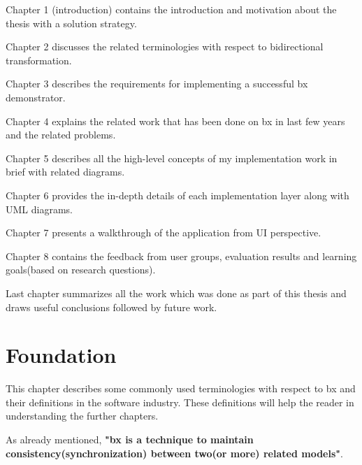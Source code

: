 Chapter 1 (introduction) contains the introduction and motivation about the thesis with a solution strategy.

Chapter 2 discusses the related terminologies with respect to bidirectional transformation.

Chapter 3 describes the requirements for implementing a successful bx demonstrator.

Chapter 4 explains the related work that has been done on bx in last few years and the related problems.

Chapter 5 describes all the high-level concepts of my implementation work in brief with related diagrams.

Chapter 6 provides the in-depth details of each implementation layer along with UML diagrams.

Chapter 7 presents a walkthrough of the application from UI perspective.

Chapter 8 contains the feedback from user groups, evaluation results and learning goals(based on research questions).

Last chapter summarizes all the work which was done as part of this thesis and draws useful conclusions followed by future work.

\section{Foundation}\label{sec:foundation}
This chapter describes some commonly used terminologies with respect to bx and their definitions in the software industry. These definitions will help the reader in understanding the further chapters.

As already mentioned, \textbf{"bx is a technique to maintain consistency(synchronization) between two(or more) related models"}.

